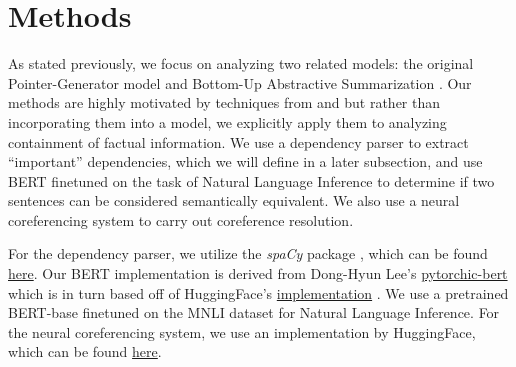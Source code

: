 \documentclass{article}
\begin{document}
\section{Methods}
\label{sec:methods}






As stated previously, we focus on analyzing two related models: the original Pointer-Generator model \cite{see2017get} and Bottom-Up Abstractive Summarization \cite{gehrmann2018bottom}. %
Our methods are highly motivated by techniques from \cite{pasunuru2017towards} and \cite{cao2018faithful} but rather than incorporating them into a model, we explicitly apply them to analyzing containment of factual information. We use a dependency parser to extract ``important'' dependencies, which we will define in a later subsection, and use BERT \cite{devlin2018bert} finetuned on the task of Natural Language Inference to determine if two sentences can be considered semantically equivalent. We also use a neural coreferencing system to carry out coreference resolution.

For the dependency parser, we utilize the \textit{spaCy} package \cite{spacy2}, which can be found \href{https://spaCy.io/usage/linguistic-features}{here}. Our BERT implementation is derived from Dong-Hyun Lee's \href{https://github.com/dhlee347/pytorchic-bert}{pytorchic-bert} which is in turn based off of HuggingFace's \href{https://github.com/huggingface/pytorch-pretrained-BERT}{implementation} \cite{neuralcoref}. We use a pretrained BERT-base finetuned on the MNLI dataset for Natural Language Inference. For the neural coreferencing system, we use an implementation by HuggingFace, which can be found \href{https://github.com/huggingface/neuralcoref}{here}.
\end{document}
